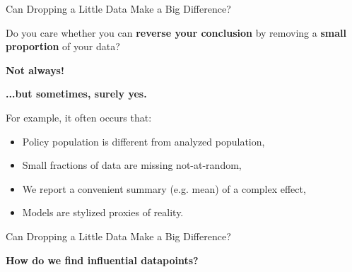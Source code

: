 \begin{frame}[t]{Can Dropping a Little Data Make a Big Difference?}

Do you care whether you can \textbf{reverse your conclusion} by removing
a \textbf{small proportion} of your data?

\vspace{1em}
\textbf{Not always!}

\vspace{1em}
\textbf{...but sometimes, surely yes.}

\vspace{1em}
For example, it often occurs that:
%
\begin{itemize}
\item Policy population is different from analyzed population,
\item Small fractions of data are missing not-at-random,
\item We report a convenient summary (e.g. mean) of a complex effect,
\item Models are stylized proxies of reality.
\end{itemize}

\end{frame}



\begin{frame}[t]{Can Dropping a Little Data Make a Big Difference?}

\textbf{How do we find influential datapoints?}


\end{frame}



